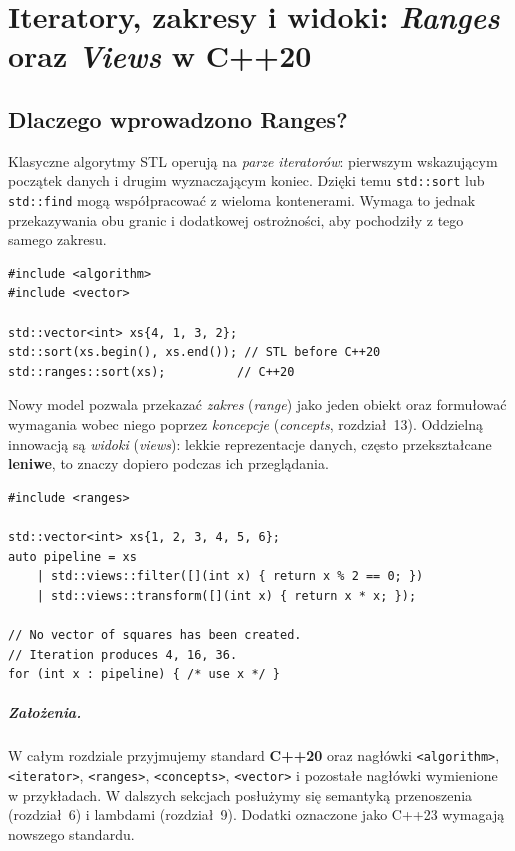 
\chapter[Iteratory, Ranges i Views]{Iteratory, zakresy i widoki: \textit{Ranges} oraz \textit{Views} w C++20}
\label{chap:ranges-views-cpp}

\section{Dlaczego wprowadzono Ranges?}

Klasyczne algorytmy STL operują na \emph{parze iteratorów}: pierwszym
wskazującym początek danych i drugim wyznaczającym koniec. Dzięki temu
\texttt{std::sort} lub \texttt{std::find} mogą współpracować z wieloma
kontenerami. Wymaga to jednak przekazywania obu granic i dodatkowej
ostrożności, aby pochodziły z tego samego zakresu.

\begin{lstlisting}
#include <algorithm>
#include <vector>

std::vector<int> xs{4, 1, 3, 2};
std::sort(xs.begin(), xs.end()); // STL before C++20
std::ranges::sort(xs);          // C++20
\end{lstlisting}

Nowy model pozwala przekazać \emph{zakres} (\textit{range}) jako jeden
obiekt oraz formułować wymagania wobec niego poprzez \emph{koncepcje}
(\textit{concepts}, rozdział~13). Oddzielną innowacją są \emph{widoki}
(\textit{views}): lekkie reprezentacje danych, często przekształcane
\textbf{leniwe}, to znaczy dopiero podczas ich przeglądania.

\begin{lstlisting}
#include <ranges>

std::vector<int> xs{1, 2, 3, 4, 5, 6};
auto pipeline = xs
    | std::views::filter([](int x) { return x % 2 == 0; })
    | std::views::transform([](int x) { return x * x; });

// No vector of squares has been created.
// Iteration produces 4, 16, 36.
for (int x : pipeline) { /* use x */ }
\end{lstlisting}

\paragraph{Założenia.}
W całym rozdziale przyjmujemy standard \textbf{C++20} oraz nagłówki
\texttt{<algorithm>}, \texttt{<iterator>}, \texttt{<ranges>},
\texttt{<concepts>}, \texttt{<vector>} i pozostałe nagłówki wymienione
w przykładach. W dalszych sekcjach posłużymy się semantyką przenoszenia
(rozdział~6) i lambdami (rozdział~9). Dodatki oznaczone jako C++23
wymagają nowszego standardu.

